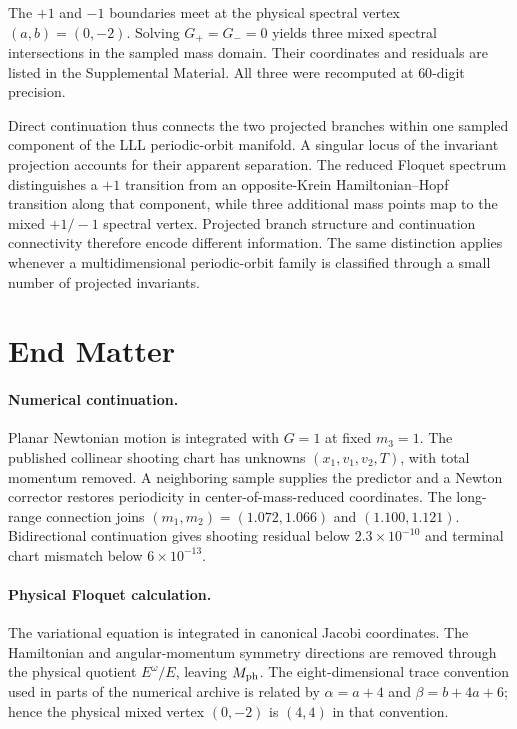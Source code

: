 \documentclass[aps,prl,reprint,amsmath,amssymb]{revtex4-2}
\begin{document}
The $+1$ and $-1$ boundaries meet at the physical spectral vertex
$(a,b)=(0,-2)$. Solving $G_+=G_-=0$ yields three mixed spectral intersections
in the sampled mass domain. Their coordinates and residuals are listed in the
Supplemental Material. All three were recomputed at $60$-digit precision.

Direct continuation thus connects the two projected branches within one
sampled component of the LLL periodic-orbit manifold. A singular locus of the
invariant projection accounts for their apparent separation. The reduced
Floquet spectrum distinguishes a $+1$ transition from an opposite-Krein
Hamiltonian--Hopf transition along that component, while three additional mass
points map to the mixed $+1/-1$ spectral vertex. Projected branch structure and
continuation connectivity therefore encode different information. The same
distinction applies whenever a multidimensional periodic-orbit family is
classified through a small number of projected invariants.

\section*{End Matter}

\paragraph{Numerical continuation.}
Planar Newtonian motion is integrated with $G=1$ at fixed $m_3=1$. The
published collinear shooting chart has unknowns $(x_1,v_1,v_2,T)$, with total
momentum removed. A neighboring sample supplies the predictor and a Newton
corrector restores periodicity in center-of-mass-reduced coordinates. The
long-range connection joins $(m_1,m_2)=(1.072,1.066)$ and $(1.100,1.121)$.
Bidirectional continuation gives shooting residual below
$2.3\times10^{-10}$ and terminal chart mismatch below $6\times10^{-13}$.

\paragraph{Physical Floquet calculation.}
The variational equation is integrated in canonical Jacobi coordinates. The
Hamiltonian and angular-momentum symmetry directions are removed through the
physical quotient $E^{\omega}/E$, leaving $M_{\rm ph}$. The eight-dimensional
trace convention used in parts of the numerical archive is related by
$\alpha=a+4$ and $\beta=b+4a+6$; hence the physical mixed vertex $(0,-2)$ is
$(4,4)$ in that convention.
\end{document}
